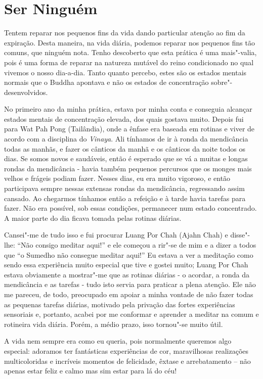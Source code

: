 \chapter{Ser Ninguém}

Tentem  reparar nos pequenos fins da vida dando particular atenção ao
fim da expiração. Desta maneira, na vida diária, podemos reparar nos
pequenos fins tão comuns, que ninguém nota. Tenho descoberto que esta
prática é uma mais"-valia, pois é uma forma de reparar na natureza
mutável do reino condicionado no qual vivemos o nosso dia-a-dia. Tanto
quanto percebo, estes são os estados mentais normais que o Buddha
apontava e não os estados de concentração sobre"-desenvolvidos.

No primeiro ano da minha prática, estava por minha conta e conseguia
alcançar estados mentais de concentração elevada, dos quais gostava
muito. Depois fui para Wat Pah Pong (Tailândia), onde a ênfase era
baseada em rotinas e viver de acordo com a disciplina do \emph{Vinaya}.
Ali tínhamos de ir à ronda da mendicância todas as manhãs, e fazer os
cânticos da manhã e os cânticos da noite todos os dias. Se somos novos e
saudáveis, então é esperado que se vá a muitas e longas rondas da
mendicância - havia também pequenos percursos que os monges mais velhos
e frágeis podiam fazer. Nesses dias, eu era muito vigoroso, e então
participava sempre nessas extensas rondas da mendicância, regressando
assim cansado. Ao chegarmos tínhamos então a refeição e à tarde havia
tarefas para fazer. Não era possível, sob essas condições, permanecer
num estado concentrado. A maior parte do dia ficava tomada pelas rotinas
diárias.

Cansei"-me de tudo isso e fui procurar Luang Por Chah (Ajahn Chah) e
disse"-lhe: ``Não consigo meditar aqui!'' e ele começou a rir"-se de mim e
a dizer a todos que ``o Sumedho não consegue meditar aqui!'' Eu estava a
ver a meditação como sendo essa experiência muito especial que tive e
gostei muito; Luang Por Chah estava obviamente a mostrar"-me que as
rotinas diárias - o acordar, a ronda da mendicância e as tarefas - tudo
isto servia para praticar a plena atenção. Ele não me pareceu, de todo,
preocupado em apoiar a minha vontade de não fazer todas as pequenas
tarefas diárias, motivado pela privação das fortes experiências
sensoriais e, portanto, acabei por me conformar e aprender a meditar na
comum e rotineira vida diária. Porém, a médio prazo, isso tornou"-se
muito útil.

A vida nem sempre era como eu queria, pois normalmente queremos algo
especial: adoramos ter fantásticas experiências de cor, maravilhosas
realizações multicoloridas e incríveis momentos de felicidade, êxtase e
arrebatamento -- não apenas estar feliz e calmo mas sim estar para lá do
céu!

